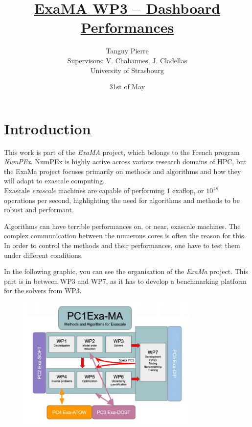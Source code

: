 \documentclass[12pt]{article}
\title{\underline{\textbf{ExaMA WP3 -- Dashboard Performances}}}
\author{Tanguy Pierre\\
            [1cm]
            Supervisors: V. Chabannes, J. Cladellas\\
            [2cm]
            University of Strasbourg}
\date{31st of May}
\begin{document}
    \maketitle      %

\newpage
\tableofcontents

\newpage
\section{Introduction}

This work is part of the \textit{ExaMA} project, which belongs to the French program \textit{NumPEx}\cite*{NumPEx}.
NumPEx is highly active across various research domains of HPC, but the ExaMa project focuses primarily on methods and algorithms and how they will adapt to exascale computing. \\
Exascale \textit{exascale} machines are capable of performing $1$ exaflop, or $10^{18}$ operations per second, highlighting the need for algorithms and methods to be robust and performant.

Algorithms can have terrible performances on, or near, exascale machines.
The complex communication between the numerous cores is often the reason for this.
In order to control the methods and their performances, one have to test them under different conditions.

In the following graphic, you can see the organisation of the \textit{ExaMa} project.
This part is in between WP3 and WP7, as it has to develop a benchmarking platform for the solvers from WP3.


\begin{figure}[h]
    \centering
    \includegraphics[width=0.8\textwidth]{../illustrations/ExaMa-orga.png}
\end{figure}
\end{document}
